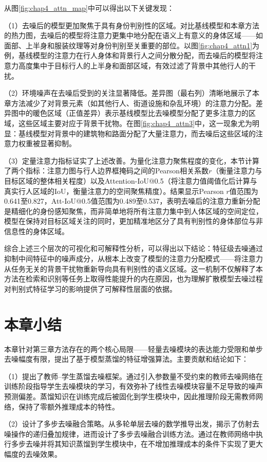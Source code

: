 从图\ref{fig:chap4_attn_map}中可以得出以下关键发现：

（1）去噪后的模型更加聚焦于具有身份判别性的区域。对比基线模型和本章方法的热力图，去噪后的模型将注意力更集中地分配在语义上有意义的身体区域——如面部、上半身和服装纹理等对身份判别至关重要的部位。以图\ref{fig:chap4_attn1}为例，基线模型的注意力在行人身体和背景行人之间分散分配，而去噪后的模型将注意力高度集中于目标行人的上半身和面部区域，有效过滤了背景中其他行人的干扰。

（2）环境噪声在去噪后受到的关注显著降低。差异图（最右列）清晰地展示了本章方法减少了对背景元素（如其他行人、街道设施和杂乱环境）的注意力分配。差异图中的暖色区域（正值差异）表示基线模型比去噪模型分配了更多注意力的区域，这些区域主要对应于背景干扰物。在图\ref{fig:chap4_attn3}中，这一现象尤为明显：基线模型对背景中的建筑物和路面分配了大量注意力，而去噪后这些区域的注意力权重被显著抑制。

（3）定量注意力指标证实了上述改善。为量化注意力聚焦程度的变化，本节计算了两个指标：注意力图与行人边界框掩码之间的Pearson相关系数$r$（衡量注意力与目标区域的整体相关程度）以及Attention-IoU@0.5（将注意力值阈值化后计算与真实行人区域的IoU，衡量注意力的空间聚焦精度）。结果显示Pearson $r$值范围为0.641至0.827，Att-IoU@0.5值范围为0.489至0.537，表明去噪后的注意力重新分配是精细化的身份感知聚焦，而非简单地将所有注意力集中到人体区域的空间定位，模型在保持对目标区域关注的同时，更加精准地区分了具有判别性的身体部位与非信息性的身体区域。

综合上述三个层次的可视化和可解释性分析，可以得出以下结论：特征级去噪通过抑制中间特征中的噪声成分，从根本上改变了模型的注意力分配模式——将注意力从任务无关的背景干扰物重新导向具有判别性的语义区域。这一机制不仅解释了本方法在检索和识别等任务上取得性能提升的内在原因，也为理解扩散模型去噪过程对判别式特征学习的影响提供了可解释性层面的依据。

\section{本章小结}
\label{sec:chap4_summary}

本章针对第三章方法存在的两个核心局限——轻量去噪模块的表达能力受限和单步去噪幅度有限，提出了基于模型蒸馏的特征增强算法。主要贡献和结论如下：

（1）提出了教师--学生蒸馏去噪框架。通过引入参数量不受约束的教师去噪网络在训练阶段指导学生去噪模块的学习，有效弥补了线性去噪模块容量不足导致的噪声预测偏差。蒸馏知识在训练完成后被固化到学生模块中，因此推理阶段无需教师网络，保持了零额外推理成本的特性。

（2）设计了多步去噪融合策略。从多轮单层去噪的数学推导出发，揭示了仿射去噪操作的递归叠加规律，进而设计了多步去噪融合训练方法。通过在教师网络中执行多步去噪并将其知识蒸馏到学生模块中，在不增加推理成本的条件下实现了更大幅度的去噪效果。

